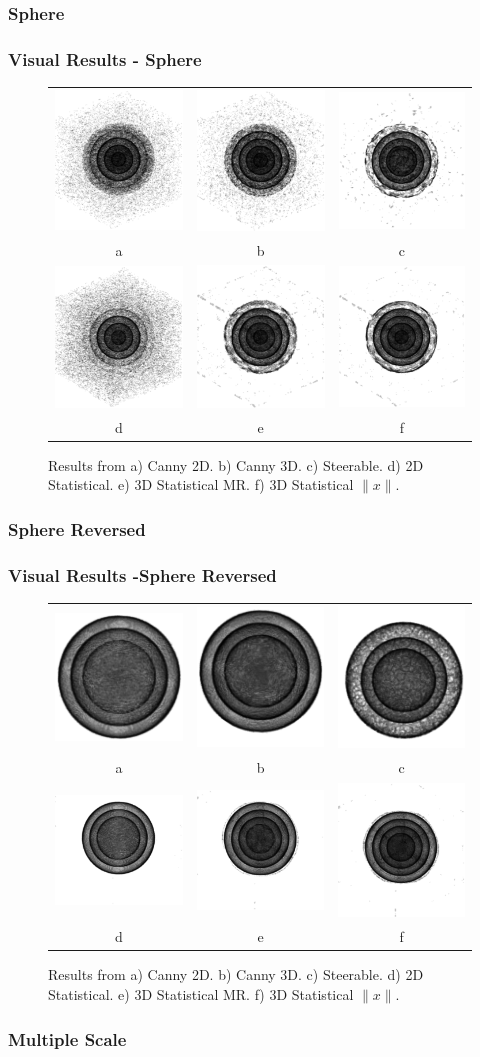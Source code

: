 \documentclass[9pt]{beamer}
\begin{document}
\subsubsection{Sphere}
\begin{frame}

\frametitle{Visual Results - Sphere}

\begin{figure}
\begin{tabular}{c c c }
\includegraphics[scale=0.18]{canny2dsphere.eps}&\includegraphics[scale=0.18]{Cannysigma3sphere}&\includegraphics[scale=0.18]{SteerableFilterSigma2sphere}\\
a & b & c \\
\includegraphics[scale=0.18]{stat2dsphere.eps}& \includegraphics[scale=0.18]{T3_sphere}&\includegraphics[scale=0.18]{T13_sphere}\\

d & e & f\\

\end{tabular}
\caption{ Results from a) Canny 2D. b) Canny 3D. c) Steerable. d) 2D Statistical. e) 3D Statistical MR. f) 3D Statistical $\|x\|$.}
\end{figure}
\end{frame}
\subsubsection{Sphere Reversed}
\begin{frame}

\frametitle{Visual Results -Sphere Reversed}
\begin{figure}
\begin{tabular}{c c c }
\includegraphics[scale=0.18]{canny2dsphereR.eps}&\includegraphics[scale=0.18]{Cannysigma3sphereR}&\includegraphics[scale=0.18]{SteerableFilterSigma2sphereR}\\
a & b & c\\
\includegraphics[scale=0.18]{stat2dsphereR.eps} & \includegraphics[scale=0.18]{T3_sphereR}&\includegraphics[scale=0.18]{T13_sphereR}\\

d & e & f\\
\end{tabular}
\caption{ Results from a) Canny 2D. b) Canny 3D. c) Steerable. d) 2D Statistical. e) 3D Statistical MR. f) 3D Statistical $\|x\|$.}
\end{figure}
\end{frame}
\subsubsection{Multiple Scale}
\begin{frame}[shrink]
\frametitle{Visual R
\end{frame}
\end{document}
